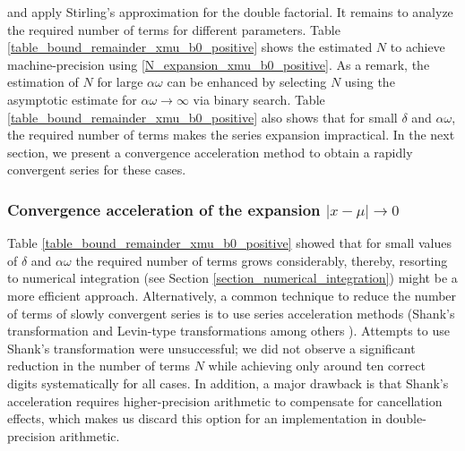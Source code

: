 \documentclass[10pt,a4paper,oneside]{article}
\numberwithin{equation}{section}
\begin{document}
and apply Stirling's approximation for the double factorial. It remains to analyze the required number of terms for different parameters. Table \ref{table_bound_remainder_xmu_b0_positive} shows the estimated $N$ to achieve machine-precision using \eqref{N_expansion_xmu_b0_positive}. As a remark, the estimation of $N$ for large $\alpha\omega$ can be enhanced by selecting $N$ using the asymptotic estimate for $\alpha\omega \to \infty$ via binary search. Table \ref{table_bound_remainder_xmu_b0_positive} also shows that for small $\delta$ and $\alpha\omega$, the required number of terms makes the series expansion impractical. In the next section, we present a convergence acceleration method to obtain a rapidly convergent series for these cases.

\begin{table}[htp]
	\centering
	\caption{The remainder of the series expansion  \eqref{expansion_xmu_b0_positive} and estimated $N$ using \eqref{N_expansion_xmu_b0_positive} to achieve machine precision.}
	\label{table_bound_remainder_xmu_b0_positive}
\end{table}

\subsubsection{Convergence acceleration of the expansion $|x-\mu| \to 0$}
Table \ref{table_bound_remainder_xmu_b0_positive} showed that for small values of $\delta$ and $\alpha \omega$ the required number of terms grows considerably, thereby, resorting to numerical integration (see Section \ref{section_numerical_integration}) might be a more efficient approach. Alternatively, a common technique to reduce the number of terms of slowly convergent series is to use series acceleration methods (Shank's transformation and Levin-type transformations among others \cite[\S 9]{Gil2007}). 
Attempts to use Shank's transformation were unsuccessful; we did not observe a significant reduction in the number of terms $N$ while achieving only around ten correct digits systematically for all cases. In addition, a major drawback is that Shank's acceleration requires higher-precision arithmetic to compensate for cancellation effects, which makes us discard this option for an implementation in double-precision arithmetic. 
\end{document}
